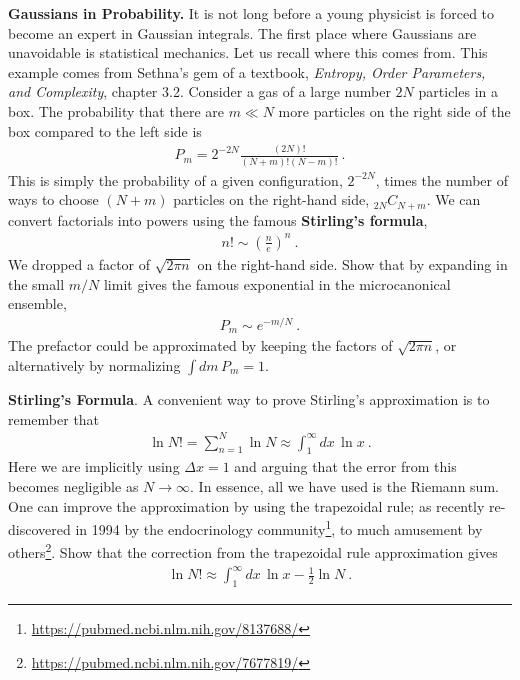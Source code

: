 \begin{exercise}
\textbf{Gaussians in Probability.} It is not long before a young physicist is forced to become an expert in Gaussian integrals. The first place where Gaussians are unavoidable is statistical mechanics. Let us recall where this comes from. This example comes from Sethna's gem of a textbook, \emph{Entropy, Order Parameters, and Complexity}, chapter 3.2. Consider a gas of a large number $2N$ particles in a box. The probability that there are $m \ll N$ more particles on the right side of the box compared to the left side is
\begin{align}
	P_m = 2^{-2N}\frac{(2N)!}{(N+m)!(N-m)!} \ .
\end{align}
This is simply the probability of a given configuration, $2^{-2N}$, times the number of ways to choose $(N+m)$ particles on the right-hand side, $_{2N}C_{N+m}$. We can convert factorials into powers using the famous \textbf{Stirling's formula},
\begin{align}
	n! \sim \left(\frac{n}{e}\right)^n \ .
\end{align}
We dropped a factor of $\sqrt{2\pi n}$ on the right-hand side. Show that by expanding in the small $m/N$ limit gives the famous exponential in the microcanonical ensemble,
\begin{align}
	P_m \sim e^{-m/N}\ .
\end{align}
The prefactor could be approximated by keeping the factors of $\sqrt{2\pi n}$, or alternatively by normalizing $\int dm \, P_m = 1$.
\end{exercise}

\begin{exercise}
\textbf{Stirling's Formula}. A convenient way to prove Stirling's approximation is to remember that
\begin{align}
	\ln N! = \sum_{n=1}^N \ln N \approx \int_1^\infty dx\, \ln x \ .
\end{align}
Here we are implicitly using $\Delta x = 1$ and arguing that the error from this becomes negligible as $N\to \infty$. In essence, all we have used is the Riemann sum. One can improve the approximation by using the trapezoidal rule; as recently re-discovered in 1994 by the endocrinology community\footnote{\url{https://pubmed.ncbi.nlm.nih.gov/8137688/}}, to much amusement by others\footnote{\url{https://pubmed.ncbi.nlm.nih.gov/7677819/}}. Show that the correction from the trapezoidal rule approximation gives
\begin{align}
	\ln N! \approx \int_1^\infty dx\, \ln x - \frac{1}{2}\ln N \ .
\end{align}
\end{exercise}


